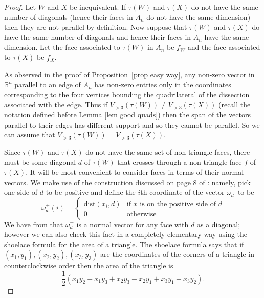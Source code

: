 \documentclass[11pt]{article}
\newcommand{\R}{\mathbb{R}}
\theoremstyle{remark}
\theoremstyle{definition}
\begin{document}
\begin{proof}
  Let $W$ and $X$ be inequivalent.  If $\tau(W)$ and $\tau(X)$ do not have the same number of diagonals (hence their faces in $A_n$ do not have the same dimension) then they are not parallel by definition. Now suppose that $\tau(W)$ and $\tau(X)$ do have the same number of diagonals and hence their faces in $A_n$ have the same dimension.  Let the face associated to $\tau(W)$ in $A_n$ be $f_W$ and the face associated to $\tau(X)$ be $f_X$.

As observed in the proof of Proposition~\ref{prop easy way}, any non-zero vector in $\R^n$ parallel to an edge of $A_n$ has non-zero entries only in the coordinates corresponding to the four vertices bounding the quadrilateral of the dissection associated with the edge.  Thus if $V_{>3}(\tau(W)) \neq V_{>3}(\tau(X))$ (recall the notation defined before Lemma \ref{lem good quads}) then the span of the vectors parallel to their edges has different support and so they cannot be parallel.  So we can assume that $V_{>3}(\tau(W)) = V_{>3}(\tau(X))$.

    Since $\tau(W)$ and $\tau(X)$ do not have the same set of non-triangle faces, there must be some diagonal $d$ of $\tau(W)$ that crosses through a non-triangle face $f$ of $\tau(X)$. 
    It will be most convenient to consider faces in terms of their normal vectors. We make use of the construction discussed on page 8 of \cite{CSZinequivalent}: namely, pick one side of $d$ to be positive and define the $i$th coordinate of the vector $\omega^+_d$ to be
    \[
    \omega^+_d(i) = \begin{cases} \text{dist}(x_i, d) & \text{if $x$ is on the positive side of $d$}\\ 0 & \text{otherwise} \end{cases}
    \]
    We have from \cite{CSZinequivalent} that $\omega^+_d$ is a normal vector for any face with $d$ as a diagonal; however we can also check this fact in a completely elementary way using the shoelace formula for the area of a triangle.  The shoelace formula says that if $(x_1, y_1), (x_2, y_2), (x_3, y_3)$ are the coordinates of the corners of a triangle in counterclockwise order then the area of the triangle is \[\textstyle\frac{1}{2}(x_1y_2 - x_1y_3 + x_2y_3 - x_2y_1 + x_3y_1 - x_3y_2).\]


\end{proof}
\end{document}
